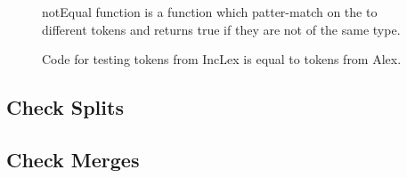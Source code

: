 \begin{figure}[h!]
  \centering
  
  notEqual function is a function which patter-match on the to different tokens and returns true if they are not of the same type.
  \caption{Code for testing tokens from IncLex is equal to tokens from Alex. 
  \label{fig:CheckEquility}}
\end{figure} 

\subsection{Check Splits}

\subsection{Check Merges} 

